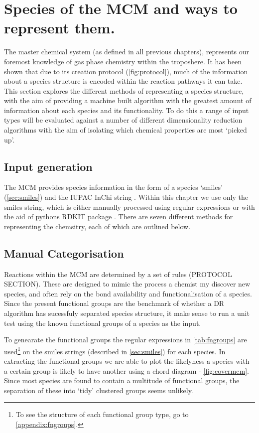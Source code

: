 \section{Species of the MCM and ways to represent them.}\label{sec:drinput}
The master chemical system (as defined in all previous chapters), represents our foremost knowledge of gas phase chemistry within the troposhere. It has been shown that due to its creation protocol (\autoref{fig:protocol}), much of the information about a species structure is encoded within the reaction pathways it can take. This section explores the different methods of representing a species structure, with the aim of providing a machine built algorithm with the greatest amount of information about each species and its functionality. To do this a range of input types will be evaluated against a number of different dimensionality reduction algorithms with the aim of isolating which chemical properties are most `picked up'. 

\subsection{Input generation}
The MCM provides species information in the form of a species `smiles' (\autoref{sec:smiles}) and the IUPAC InChi string \citep{inchi}. Within this chapter we use only the smiles string, which is either manually processed using regular expressions or with the aid of pythons RDKIT package \citep{rdkit}. There are seven different methods for representing the chemsitry, each of which are outlined below. 


\subsection{Manual Categorisation}
Reactions within the MCM are determined by a set of rules (PROTOCOL SECTION). These are designed to mimic the process a chemist my discover new species, and often rely on the bond availability and functionalisation of a species. Since the present functional groups are the benchmark of whether a DR algorithm has sucessfuly separated species structure, it make sense to run a unit test using the known functional groups of a species as the input. 

To genearate the functional groups the regular expressions in \autoref{tab:fngroups} are used\footnote{To see the structure of each functional group type, go to \autoref{appendix:fngroups}.} on the smiles strings (described in \autoref{sec:smiles}) for each species. In extracting the functional groups we are able to plot the likelyness a species with a certain group is likely to have another using a chord diagram - \autoref{fig:covermcm}. Since most species are found to contain a multitude of functional groups, the separation of these into `tidy' clustered groups seems unlikely.      



